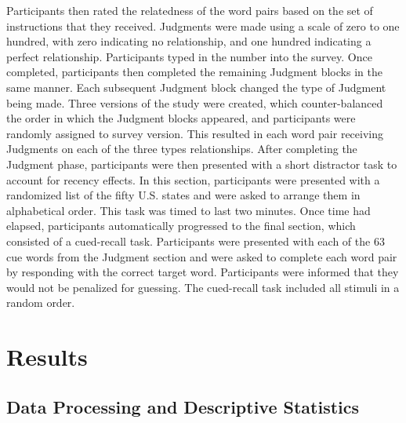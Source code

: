 \documentclass[english,man]{apa6}
\theoremstyle{definition}
\theoremstyle{definition}
\theoremstyle{definition}
\theoremstyle{remark}
\begin{document}
Participants then rated the relatedness of the word pairs based on the
set of instructions that they received. Judgments were made using a
scale of zero to one hundred, with zero indicating no relationship, and
one hundred indicating a perfect relationship. Participants typed in the
number into the survey. Once completed, participants then completed the
remaining Judgment blocks in the same manner. Each subsequent Judgment
block changed the type of Judgment being made. Three versions of the
study were created, which counter-balanced the order in which the
Judgment blocks appeared, and participants were randomly assigned to
survey version. This resulted in each word pair receiving Judgments on
each of the three types relationships. After completing the Judgment
phase, participants were then presented with a short distractor task to
account for recency effects. In this section, participants were
presented with a randomized list of the fifty U.S. states and were asked
to arrange them in alphabetical order. This task was timed to last two
minutes. Once time had elapsed, participants automatically progressed to
the final section, which consisted of a cued-recall task. Participants
were presented with each of the 63 cue words from the Judgment section
and were asked to complete each word pair by responding with the correct
target word. Participants were informed that they would not be penalized
for guessing. The cued-recall task included all stimuli in a random
order.

\section{Results}\label{results}

\subsection{Data Processing and Descriptive
Statistics}\label{data-processing-and-descriptive-statistics}
\end{document}
